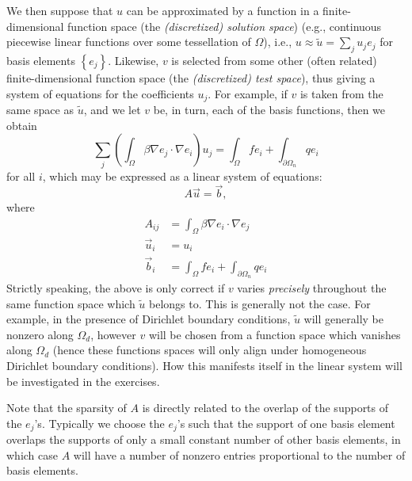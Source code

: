 We then suppose that $u$ can be approximated by a function in a finite-di\-men\-sion\-al function space (the \emph{(discretized) solution space}) (e.g., continuous piecewise linear functions over some tessellation of $\Omega$), i.e., $u \approx \tilde{u} = \sum_j u_j e_j$ for basis elements $\left\{ e_j \right\}$. Likewise, $v$ is selected from some other (often related) finite-dimensional function space (the \emph{(discretized) test space}), thus giving a system of equations for the coefficients $u_j$. For example, if $v$ is taken from the same space as $\tilde{u}$, and we let $v$ be, in turn, each of the basis functions, then we obtain
\begin{equation}\label{eq:poisson.system.i}
\sum_j \left( \int_{\Omega} \beta \nabla e_j \cdot \nabla e_i \right) u_j = \int_{\Omega} f e_i + \int_{\partial \Omega_n} q e_i
\end{equation}
for all $i$, which may be expressed as a linear system of equations:
\begin{equation}\label{eq:poisson.system.a}
A \vec{u} = \vec{b},
\end{equation}
where
\begin{subequations}\label{eq:poisson.system.b}
\begin{align}
A_{ij} & = \int_{\Omega} \beta \nabla e_i \cdot \nabla e_j \label{eq:poisson.system.Aij} \\
\vec{u}_i & = u_i \\
\vec{b}_i & = \int_{\Omega} f e_i + \int_{\partial \Omega_n} q e_i \label{eq:poisson.system.bi}
\end{align}
\end{subequations}
Strictly speaking, the above is only correct if $v$ varies \emph{precisely} throughout the same function space which $\tilde{u}$ belongs to. This is generally not the case. For example, in the presence of Dirichlet boundary conditions, $\tilde{u}$ will generally be nonzero along $\Omega_d$, however $v$ will be chosen from a function space which vanishes along $\Omega_d$ (hence these functions spaces will only align under homogeneous Dirichlet boundary conditions). How this manifests itself in the linear system will be investigated in the exercises.

Note that the sparsity of $A$ is directly related to the overlap of the supports of the $e_j$'s. Typically we choose the $e_j$'s such that the support of one basis element overlaps the supports of only a small constant number of other basis elements, in which case $A$ will have a number of nonzero entries proportional to the number of basis elements.


